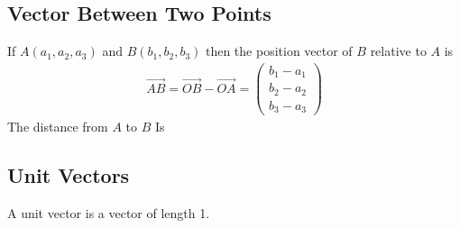 \documentclass[10pt, a4paper, titlepage]{article}
\begin{document}
\begin{multicols*}{3}
\subsection{Vector Between Two Points}
If $A(a_1,a_2,a_3)$ and $B(b_1,b_2,b_3)$ then the position vector of $B$ relative to $A$ is 
\begin{align}
	\overrightarrow{AB}=\overrightarrow{OB}-\overrightarrow{OA}=\begin{pmatrix}b_1-a_1\\ b_2-a_2 \\b_3-a_3\end{pmatrix}
\end{align}
The distance from $A$ to $B$ Is
\subsection{Unit Vectors}
A unit vector is a vector of length 1.
\end{multicols*}
\end{document}
